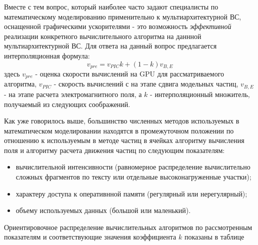 Вместе с тем вопрос, который наиболее часто задают специалисты по математическому моделированию применительно к мультиархитектурной ВС, оснащенной графическими ускорителями - это возможность \textit{эффективной} реализации конкретного вычислительного алгоритма на даннной мультиархитектурной ВС.
Для ответа на данный вопрос предлагается интерполяционная формула:
\begin{equation}
v_{pre} = v_{PIC} k + (1-k) v_{B,E}
\end{equation} 
здесь $ v_{pre}$ - оценка скорости вычислений на GPU для рассматриваемого алгоритма, $v_{PIC}$ - скорость вычислений с на этапе сдвига модельных частиц, $v_{B,E}$ - на этапе расчета электромагнитного поля, а $k$ - интерполяционный множитель, получаемый из следующих соображений.

Как уже говорилось выше, большинство численных методов используемых в математическом моделировании находятся в промежуточном положении по отношению к используемым в методе частиц в ячейках алгоритму вычисления поля и алгоритму расчета движения частиц по следующим показателям:
\begin{itemize}
	\item вычислительной интенсивности (равномерное распределение вычислительно сложных фрагментов по тексту или отдельные высоконагруженные участки);
	\item характеру доступа к оперативнной памяти (регулярный или нерегулярный);
	\item объему используемых данных (большой или маленький).
\end{itemize}
Ориентировочное распределение вычислительных алгоритмов по рассмотренным показателям и соответствующие значения коэффициента $k$ показаны в таблице 


